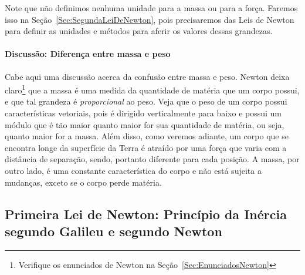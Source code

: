 Note que não definimos nenhuma unidade para a massa ou para a força. Faremos isso na Seção~\ref{Sec:SegundaLeiDeNewton}, pois precisaremos das Leis de Newton para definir as unidades e métodos para aferir os valores dessas grandezas.

\paragraph{Discussão: Diferença entre massa e peso}

Cabe aqui uma discussão acerca da confusão entre massa e peso. Newton deixa claro\footnote{Verifique os enunciados de Newton na Seção~\ref{Sec:EnunciadosNewton}} que a massa é uma medida da quantidade de matéria que um corpo possui, e que tal grandeza é \emph{proporcional} ao peso. Veja que o peso de um corpo possui características vetoriais, pois é dirigido verticalmente para baixo e possui um módulo que é tão maior quanto maior for sua quantidade de matéria, ou seja, quanto maior for a massa. Além disso, como veremos adiante, um corpo que se encontra longe da superfície da Terra é atraído por uma força que varia com a distância de separação, sendo, portanto diferente para cada posição. A massa, por outro lado, é uma constante característica do corpo e não está sujeita a mudanças, exceto se o corpo perde matéria.


\subsection{Primeira Lei de Newton: Princípio da Inércia segundo Galileu e segundo Newton}

